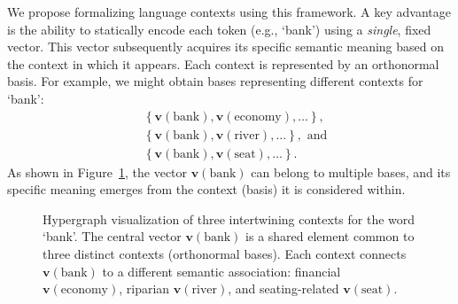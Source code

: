 \documentclass[%
  reprint,
  superscriptaddress,
  showpacs,
  showkeys,
  amsmath,amssymb,
  pra,
  longbibliography,
  floatfix,
  x11names
]{revtex4-2}
\begin{document}
We propose formalizing language contexts using this framework.
A key advantage is the ability to statically encode each token (e.g., `bank') using a
\textit{single}, fixed vector. This vector subsequently acquires its specific
semantic meaning based on the context in which it appears.
Each context is represented by an orthonormal basis.
For example, we might obtain bases representing different contexts for `bank':
\begin{align*} %
& \left\{ \bm{v}(\text{bank}), \bm{v}(\text{economy}), \ldots \right\} , \\
& \left\{ \bm{v}(\text{bank}), \bm{v}(\text{river}), \ldots \right\} , \text{ and} \\
& \left\{ \bm{v}(\text{bank}), \bm{v}(\text{seat}), \ldots \right\} .
\end{align*}
As shown in Figure~\ref{fig:intertwining_contexts}, the vector $\bm{v}(\text{bank})$
can belong to multiple bases, and its specific meaning emerges from the context (basis) it is considered within.

\begin{figure}[t]
    \centering
{}
\caption{Hypergraph visualization of three intertwining contexts for the word `bank'.
The central vector $\bm{v}(\text{bank})$ is a shared element common to three distinct contexts (orthonormal bases). Each context connects $\bm{v}(\text{bank})$
to a different semantic association: financial $\bm{v}(\text{economy})$, riparian $\bm{v}(\text{river})$, and seating-related $\bm{v}(\text{seat})$.}
    \label{fig:intertwining_contexts}
\end{figure}
\end{document}

